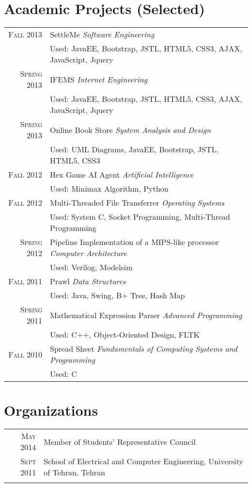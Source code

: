 \documentclass[a4paper,10pt]{article}
\begin{document}
\section{Academic Projects (Selected)}
\begin{tabular}{rl}
 \textsc{Fall} 2013 & SettleMe \textit{\footnotesize{Software Engineering}} \\ &
 \footnotesize{Used: JavaEE, Bootstrap, JSTL, HTML5, CSS3, AJAX, JavaScript, Jquery}\\
\textsc{Spring} 2013 & IFEMS \textit{\footnotesize{Internet Engineering}} \\ &
\footnotesize{Used: JavaEE, Bootstrap, JSTL, HTML5, CSS3, AJAX, JavaScript, Jquery}\\
\textsc{Spring} 2013 & Online Book Store \textit{\footnotesize{System Analysis and Design}} \\ &
\footnotesize{Used: UML Diagrams, JavaEE, Bootstrap, JSTL, HTML5, CSS3}\\
\textsc{Fall} 2012 & Hex Game AI Agent \textit{\footnotesize{Artificial Intelligence}} \\ &
\footnotesize{Used: Minimax Algorithm, Python}\\
\textsc{Fall} 2012 & Multi-Threaded File Transferrer \textit{\footnotesize{Operating Systems}} \\ &
\footnotesize{Used: System C, Socket Programming, Multi-Thread Programming}\\
\textsc{Spring} 2012 & Pipeline Implementation of a MIPS-like processor \textit{\footnotesize{Computer Architecture}} \\ &
\footnotesize{Used: Verilog, Modelsim}\\
\textsc{Fall} 2011 & Prawl \textit{\footnotesize{Data Structures}} \\ &
\footnotesize{Used: Java, Swing, B+ Tree, Hash Map}\\
\textsc{Spring} 2011 & Mathematical Expression Parser \textit{\footnotesize{Advanced Programming}} \\ &
\footnotesize{Used: C++, Object-Oriented Design, FLTK}\\
\textsc{Fall} 2010 & Spread Sheet \textit{\footnotesize{Fundamentals of Computing Systems and Programming}} \\ &
\footnotesize{Used: C}\\
\end{tabular}

\section{Organizations}
\begin{tabular}{r|p{11cm}}
 \textsc{May 2014} & Member of Students' Representative Council \\\textsc{Sept 2011}&
\footnotesize{School of Electrical and Computer Engineering, University of Tehran, Tehran}\\\multicolumn{2}{c}{} \\
\end{tabular}
\end{document}
